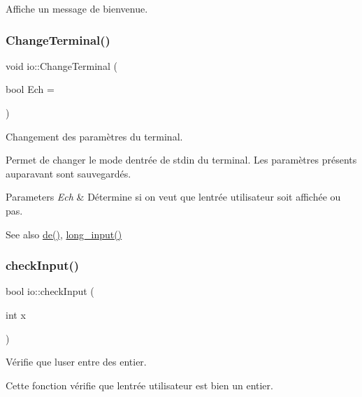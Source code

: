 Affiche un message de bienvenue. \mbox{\label{namespaceio_ac0223d0ecfee82d8cc86543604173b73}} 
\subsubsection{\texorpdfstring{Change\+Terminal()}{ChangeTerminal()}}
{\footnotesize\ttfamily void io\+::\+Change\+Terminal (\begin{DoxyParamCaption}\item[{bool}]{Ech = {} }\end{DoxyParamCaption})}



Changement des paramètres du terminal. 

Permet de changer le mode d\textquotesingle{}entrée de stdin du terminal. Les paramètres présents auparavant sont sauvegardés. 
\begin{DoxyParams}{Parameters}
{\em Ech} & Détermine si on veut que l\textquotesingle{}entrée utilisateur soit affichée ou pas. \\
\hline
\end{DoxyParams}
\begin{DoxySeeAlso}{See also}
\hyperlink{namespaceio_ae9908b55f26f07e78043d7cfad003d22}{de()}, \hyperlink{namespaceio_ab044be3afd7ac04eeb1a496af0f1d5c6}{long\+\_\+input()} 
\end{DoxySeeAlso}
\mbox{\label{namespaceio_ac79ddb3191a9d00d007eb48deb315942}} 
\subsubsection{\texorpdfstring{check\+Input()}{checkInput()}}
{\footnotesize\ttfamily bool io\+::check\+Input (\begin{DoxyParamCaption}\item[{int}]{x }\end{DoxyParamCaption})}



Vérifie que l\textquotesingle{}user entre des entier. 

Cette fonction vérifie que l\textquotesingle{}entrée utilisateur est bien un entier.

